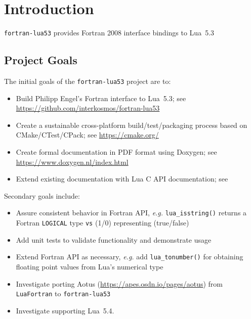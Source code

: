 \chapter{Introduction}

\texttt{fortran-lua53} provides Fortran 2008 interface bindings to Lua~5.3

\section{Project Goals}

The initial goals of the \texttt{fortran-lua53} project are to:

\begin{itemize}
    \item Build Philipp Engel's Fortran interface to Lua~5.3; see \url{https://github.com/interkosmos/fortran-lua53}
    \item Create a sustainable cross-platform build/test/packaging
          process based on CMake/CTest/CPack; see \url{https://cmake.org/}
    \item Create formal documentation in PDF format using Doxygen; see \url{https://www.doxygen.nl/index.html}
    \item Extend existing documentation with Lua C API documentation; see \cite{Lua53Manual}
\end{itemize}

Secondary goals include:

\begin{itemize}
    \item Assure consistent behavior in Fortran API, \textit{e.g.} \texttt{lua\_isstring()}
          returns a Fortran \texttt{LOGICAL} type \texttt{vs} (1/0) representing (true/false)
    \item Add unit tests to validate functionality and demonstrate usage
    \item Extend Fortran API as necessary, \textit{e.g.} add \texttt{lua\_tonumber()} for obtaining floating point values from Lua's numerical type
    \item Investigate porting Aotus (\url{https://apes.osdn.io/pages/aotus}) from \texttt{LuaFortran} to \texttt{fortran-lua53}
    \item Investigate supporting Lua~5.4.
\end{itemize}

